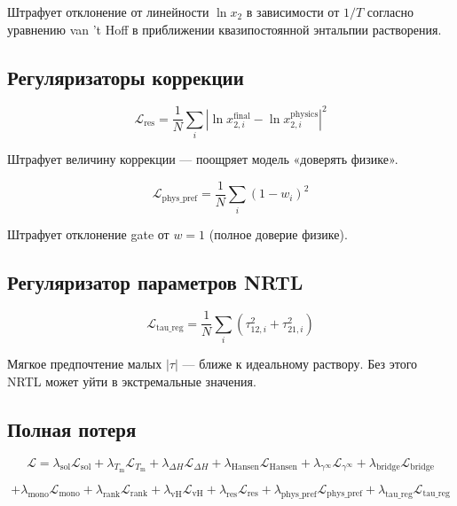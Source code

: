 \documentclass[11pt]{article}
\begin{document}
Штрафует отклонение от линейности $\ln x_2$ в зависимости от $1/T$ согласно уравнению van 't Hoff в приближении квазипостоянной энтальпии растворения.

\subsection{Регуляризаторы коррекции}

\begin{equation*}
\mathcal{L}_{\mathrm{res}} = \frac{1}{N}\sum_i \left|\ln x_{2,i}^{\mathrm{final}} - \ln x_{2,i}^{\mathrm{physics}}\right|^2
\end{equation*}

Штрафует величину коррекции --- поощряет модель «доверять физике».

\begin{equation*}
\mathcal{L}_{\mathrm{phys\_pref}} = \frac{1}{N}\sum_i (1 - w_i)^2
\end{equation*}

Штрафует отклонение gate от $w = 1$ (полное доверие физике).

\subsection{Регуляризатор параметров NRTL}
\label{subsec:tau-regularizer}

\begin{equation*}
\mathcal{L}_{\mathrm{tau\_reg}} = \frac{1}{N}\sum_i \left(\tau_{12,i}^2 + \tau_{21,i}^2\right)
\end{equation*}

Мягкое предпочтение малых $|\tau|$ --- ближе к идеальному раствору. Без этого NRTL может уйти в экстремальные значения.

\subsection{Полная потеря}

\begin{equation*}
\mathcal{L} = \lambda_{\mathrm{sol}}\mathcal{L}_{\mathrm{sol}} + \lambda_{T_{\mathrm{m}}}\mathcal{L}_{T_{\mathrm{m}}} + \lambda_{\Delta H}\mathcal{L}_{\Delta H} + \lambda_{\mathrm{Hansen}}\mathcal{L}_{\mathrm{Hansen}} + \lambda_{\gamma^\infty}\mathcal{L}_{\gamma^\infty} + \lambda_{\mathrm{bridge}}\mathcal{L}_{\mathrm{bridge}}
\end{equation*}

\begin{equation*}
+ \lambda_{\mathrm{mono}}\mathcal{L}_{\mathrm{mono}} + \lambda_{\mathrm{rank}}\mathcal{L}_{\mathrm{rank}} + \lambda_{\mathrm{vH}}\mathcal{L}_{\mathrm{vH}} + \lambda_{\mathrm{res}}\mathcal{L}_{\mathrm{res}} + \lambda_{\mathrm{phys\_pref}}\mathcal{L}_{\mathrm{phys\_pref}} + \lambda_{\mathrm{tau\_reg}}\mathcal{L}_{\mathrm{tau\_reg}}
\end{equation*}
\end{document}
